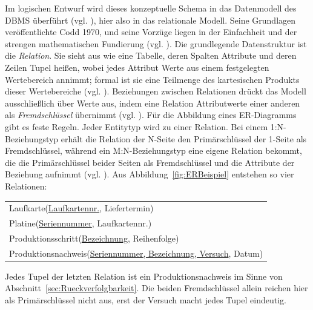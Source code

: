 Im logischen Entwurf wird dieses konzeptuelle Schema in das Datenmodell des DBMS
überführt (vgl. \cite[S.~47]{kudrassTaschenbuchInformationsmodellierung}), hier
also in das relationale Modell. Seine Grundlagen veröffentlichte Codd 1970, und
seine Vorzüge liegen in der Einfachheit und der strengen mathematischen
Fundierung (vgl. \cite[S.~67]{kudrassTaschenbuchRelationalesDatenmodell}). Die
grundlegende Datenstruktur ist die \emph{Relation}. Sie sieht aus wie eine
Tabelle, deren Spalten Attribute und deren Zeilen Tupel heißen, wobei jedes
Attribut Werte aus einem festgelegten Wertebereich annimmt; formal ist sie eine
Teilmenge des kartesischen Produkts dieser Wertebereiche (vgl.
\cite[S.~67\,f.]{kudrassTaschenbuchRelationalesDatenmodell}). Beziehungen
zwischen Relationen drückt das Modell ausschließlich über Werte aus, indem eine
Relation Attributwerte einer anderen als \emph{Fremdschlüssel} übernimmt (vgl.
\cite[S.~69]{kudrassTaschenbuchRelationalesDatenmodell}). Für die Abbildung
eines ER-Diagramms gibt es feste Regeln. Jeder Entitytyp wird zu einer
Relation. Bei einem 1:N-Beziehungstyp erhält die Relation der N-Seite den
Primärschlüssel der 1-Seite als Fremdschlüssel, während ein M:N-Beziehungstyp
eine eigene Relation bekommt, die die Primärschlüssel beider Seiten als
Fremdschlüssel und die Attribute der Beziehung aufnimmt (vgl.
\cite[S.~76--78]{kudrassTaschenbuchRelationalesDatenmodell}). Aus
Abbildung~\ref{fig:ERBeispiel} entstehen so vier Relationen:

\begin{center}
	\begin{tabular}{l}
		Laufkarte(\underline{Laufkartennr.}, Liefertermin)\\
		Platine(\underline{Seriennummer}, Laufkartennr.)\\
		Produktionsschritt(\underline{Bezeichnung}, Reihenfolge)\\
		Produktionsnachweis(\underline{Seriennummer, Bezeichnung, Versuch}, Datum)
	\end{tabular}
\end{center}

\noindent Jedes Tupel der letzten Relation ist ein Produktionsnachweis im Sinne
von Abschnitt~\ref{sec:Rueckverfolgbarkeit}. Die beiden Fremdschlüssel allein
reichen hier als Primärschlüssel nicht aus, erst der Versuch macht jedes Tupel
eindeutig.

